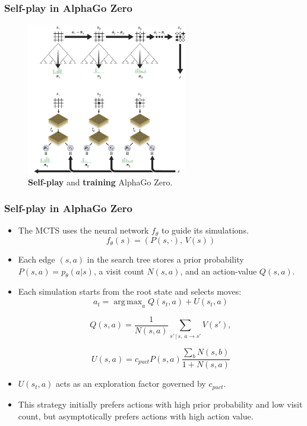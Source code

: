 \documentclass[10pt]{beamer}
\DeclareMathOperator*{\argmax}{arg\,max}
\begin{document}
\begin{frame}
	\frametitle{Self-play in AlphaGo Zero}
		
	\begin{figure}[H]
		\centering
		\includegraphics[width=7cm]{alpha_go_zero_training.png}
		
		\caption{
			\textbf{Self-play} and \textbf{training} AlphaGo Zero.\cite{Silver_2016}
			}
		\label{fig:alpha-zero-self_play}
	\end{figure}
\end{frame}


\begin{frame}
	\frametitle{Self-play in AlphaGo Zero}
	\begin{itemize}
		\item The MCTS uses the neural network $f_\theta$ to guide its simulations.
		$$f_\theta(s) = (P(s, \cdot), \, V(s))$$
		\item Each edge $(s, a)$ in the search tree stores a prior probability $P(s, a) = p_\theta(a | s)$, a visit count $N(s, a)$, and an action-value $Q(s, a)$.
	
	\item Each simulation starts from the root state and selects moves:
	\begin{equation}
		a_t  = \argmax_a{Q(s_t,a) + U(s_t,a)}
	\end{equation}

	\begin{equation}
		Q(s, a) = \frac{1}{N(s,a)} \sum_{s'\, | \, s,\, a \rightarrow s'}{V(s')},
	\end{equation}

	\begin{equation}
		U(s, a) = c_{puct}P(s, a)\frac{\sum_b N(s,b)}{1+N(s,a)}
	\end{equation}

	\item $U(s_t,a)$ acts as an exploration factor governed by $c_{puct}$.
	\item This strategy initially prefers actions with high prior probability and low visit count, but asymptotically prefers actions with high action value.
	\end{itemize}
\end{frame}
\end{document}

